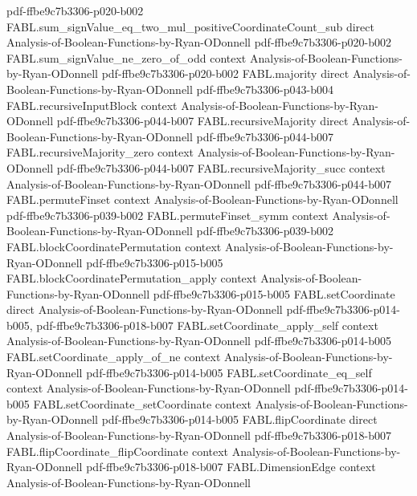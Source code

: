 \begin{theorem}
  {pdf-ffbe9c7b3306-p020-b002}
\proofstep
  {FABL.sum_signValue_eq_two_mul_positiveCoordinateCount_sub}
  {direct}
  {Analysis-of-Boolean-Functions-by-Ryan-ODonnell}
  {pdf-ffbe9c7b3306-p020-b002}
\proofstep
  {FABL.sum_signValue_ne_zero_of_odd}
  {context}
  {Analysis-of-Boolean-Functions-by-Ryan-ODonnell}
  {pdf-ffbe9c7b3306-p020-b002}
\proofstep
  {FABL.majority}
  {direct}
  {Analysis-of-Boolean-Functions-by-Ryan-ODonnell}
  {pdf-ffbe9c7b3306-p043-b004}
\proofstep
  {FABL.recursiveInputBlock}
  {context}
  {Analysis-of-Boolean-Functions-by-Ryan-ODonnell}
  {pdf-ffbe9c7b3306-p044-b007}
\proofstep
  {FABL.recursiveMajority}
  {direct}
  {Analysis-of-Boolean-Functions-by-Ryan-ODonnell}
  {pdf-ffbe9c7b3306-p044-b007}
\proofstep
  {FABL.recursiveMajority_zero}
  {context}
  {Analysis-of-Boolean-Functions-by-Ryan-ODonnell}
  {pdf-ffbe9c7b3306-p044-b007}
\proofstep
  {FABL.recursiveMajority_succ}
  {context}
  {Analysis-of-Boolean-Functions-by-Ryan-ODonnell}
  {pdf-ffbe9c7b3306-p044-b007}
\proofstep
  {FABL.permuteFinset}
  {context}
  {Analysis-of-Boolean-Functions-by-Ryan-ODonnell}
  {pdf-ffbe9c7b3306-p039-b002}
\proofstep
  {FABL.permuteFinset_symm}
  {context}
  {Analysis-of-Boolean-Functions-by-Ryan-ODonnell}
  {pdf-ffbe9c7b3306-p039-b002}
\proofstep
  {FABL.blockCoordinatePermutation}
  {context}
  {Analysis-of-Boolean-Functions-by-Ryan-ODonnell}
  {pdf-ffbe9c7b3306-p015-b005}
\proofstep
  {FABL.blockCoordinatePermutation_apply}
  {context}
  {Analysis-of-Boolean-Functions-by-Ryan-ODonnell}
  {pdf-ffbe9c7b3306-p015-b005}
\proofstep
  {FABL.setCoordinate}
  {direct}
  {Analysis-of-Boolean-Functions-by-Ryan-ODonnell}
  {pdf-ffbe9c7b3306-p014-b005,
    pdf-ffbe9c7b3306-p018-b007}
\proofstep
  {FABL.setCoordinate_apply_self}
  {context}
  {Analysis-of-Boolean-Functions-by-Ryan-ODonnell}
  {pdf-ffbe9c7b3306-p014-b005}
\proofstep
  {FABL.setCoordinate_apply_of_ne}
  {context}
  {Analysis-of-Boolean-Functions-by-Ryan-ODonnell}
  {pdf-ffbe9c7b3306-p014-b005}
\proofstep
  {FABL.setCoordinate_eq_self}
  {context}
  {Analysis-of-Boolean-Functions-by-Ryan-ODonnell}
  {pdf-ffbe9c7b3306-p014-b005}
\proofstep
  {FABL.setCoordinate_setCoordinate}
  {context}
  {Analysis-of-Boolean-Functions-by-Ryan-ODonnell}
  {pdf-ffbe9c7b3306-p014-b005}
\proofstep
  {FABL.flipCoordinate}
  {direct}
  {Analysis-of-Boolean-Functions-by-Ryan-ODonnell}
  {pdf-ffbe9c7b3306-p018-b007}
\proofstep
  {FABL.flipCoordinate_flipCoordinate}
  {context}
  {Analysis-of-Boolean-Functions-by-Ryan-ODonnell}
  {pdf-ffbe9c7b3306-p018-b007}
\proofstep
  {FABL.DimensionEdge}
  {context}
  {Analysis-of-Boolean-Functions-by-Ryan-ODonnell}

\end{theorem}
